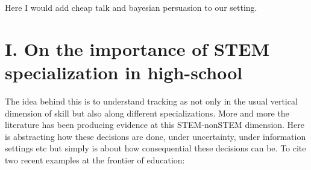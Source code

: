 \documentclass[11pt]{article}
\begin{document}
Here I would add cheap talk and bayesian persuasion to our setting.



\section{I. On the importance of STEM specialization in high-school}
The idea behind this is to understand tracking as not only in the usual vertical dimension of skill but also along different specializations. More and more the literature has been producing evidence at this STEM-nonSTEM dimension. Here is abstracting how these decisions are done, under uncertainty, under information settings etc but simply is about how consequential these decisions can be. To cite two recent examples at the frontier of education:
\end{document}
